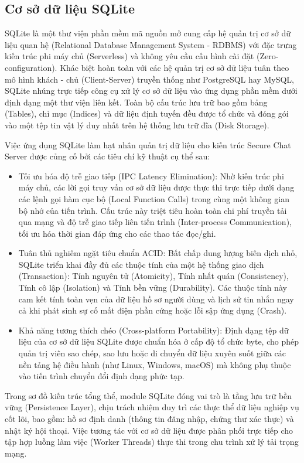 \subsection{Cơ sở dữ liệu SQLite}

SQLite là một thư viện phần mềm mã nguồn mở cung cấp hệ quản trị cơ sở dữ liệu quan hệ (Relational Database Management System - RDBMS) với đặc trưng kiến trúc phi máy chủ (Serverless) và không yêu cầu cấu hình cài đặt (Zero-configuration). Khác biệt hoàn toàn với các hệ quản trị cơ sở dữ liệu tuân theo mô hình khách - chủ (Client-Server) truyền thống như PostgreSQL hay MySQL, SQLite nhúng trực tiếp công cụ xử lý cơ sở dữ liệu vào ứng dụng phần mềm dưới định dạng một thư viện liên kết. Toàn bộ cấu trúc lưu trữ bao gồm bảng (Tables), chỉ mục (Indices) và dữ liệu định tuyến đều được tổ chức và đóng gói vào một tệp tin vật lý duy nhất trên hệ thống lưu trữ đĩa (Disk Storage).

Việc ứng dụng SQLite làm hạt nhân quản trị dữ liệu cho kiến trúc Secure Chat Server được củng cố bởi các tiêu chí kỹ thuật cụ thể sau:
\begin{itemize}[label={-}]
    \item Tối ưu hóa độ trễ giao tiếp (IPC Latency Elimination): Nhờ kiến trúc phi máy chủ, các lời gọi truy vấn cơ sở dữ liệu được thực thi trực tiếp dưới dạng các lệnh gọi hàm cục bộ (Local Function Calls) trong cùng một không gian bộ nhớ của tiến trình. Cấu trúc này triệt tiêu hoàn toàn chi phí truyền tải qua mạng và độ trễ giao tiếp liên tiến trình (Inter-process Communication), tối ưu hóa thời gian đáp ứng cho các thao tác đọc/ghi.
    \item Tuân thủ nghiêm ngặt tiêu chuẩn ACID: Bất chấp dung lượng biên dịch nhỏ, SQLite triển khai đầy đủ các thuộc tính của một hệ thống giao dịch (Transaction): Tính nguyên tử (Atomicity), Tính nhất quán (Consistency), Tính cô lập (Isolation) và Tính bền vững (Durability). Các thuộc tính này cam kết tính toàn vẹn của dữ liệu hồ sơ người dùng và lịch sử tin nhắn ngay cả khi phát sinh sự cố mất điện phần cứng hoặc lỗi sập ứng dụng (Crash).
    \item Khả năng tương thích chéo (Cross-platform Portability): Định dạng tệp dữ liệu của cơ sở dữ liệu SQLite được chuẩn hóa ở cấp độ tổ chức byte, cho phép quản trị viên sao chép, sao lưu hoặc di chuyển dữ liệu xuyên suốt giữa các nền tảng hệ điều hành (như Linux, Windows, macOS) mà không phụ thuộc vào tiến trình chuyển đổi định dạng phức tạp.
\end{itemize}

Trong sơ đồ kiến trúc tổng thể, module SQLite đóng vai trò là tầng lưu trữ bền vững (Persistence Layer), chịu trách nhiệm duy trì các thực thể dữ liệu nghiệp vụ cốt lõi, bao gồm: hồ sơ định danh (thông tin đăng nhập, chứng thư xác thực) và nhật ký hội thoại. Việc tương tác với cơ sở dữ liệu được phân phối trực tiếp cho tập hợp luồng làm việc (Worker Threads) thực thi trong chu trình xử lý tải trọng mạng.
